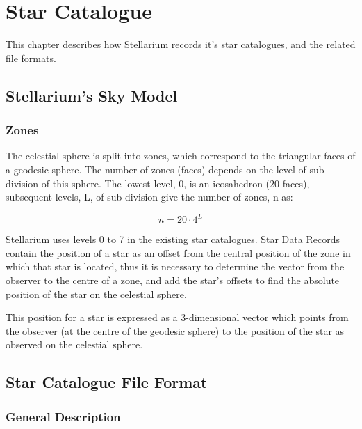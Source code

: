 
\chapter{Star Catalogue }\label{star-catalogue}

This chapter describes how Stellarium records it's star catalogues, and
the related file formats.

\section{Stellarium's Sky Model}\label{stellariums-sky-model}

\subsection{Zones}\label{zones}

The celestial sphere is split into zones, which correspond to the
triangular faces of a geodesic sphere. The number of zones (faces)
depends on the level of sub-division of this sphere. The lowest level,
0, is an icosahedron (20 faces), subsequent levels, L, of sub-division
give the number of zones, n as:

\begin{equation}
n=20 \cdot 4^L
\end{equation}

Stellarium uses levels 0 to 7 in the existing star catalogues. Star Data
Records contain the position of a star as an offset from the central
position of the zone in which that star is located, thus it is necessary
to determine the vector from the observer to the centre of a zone, and
add the star's offsets to find the absolute position of the star on the
celestial sphere.

This position for a star is expressed as a 3-dimensional vector which
points from the observer (at the centre of the geodesic sphere) to the
position of the star as observed on the celestial sphere.

\section{Star Catalogue File Format}\label{star-catalogue-file-format}

\subsection{General Description}\label{general-description}

